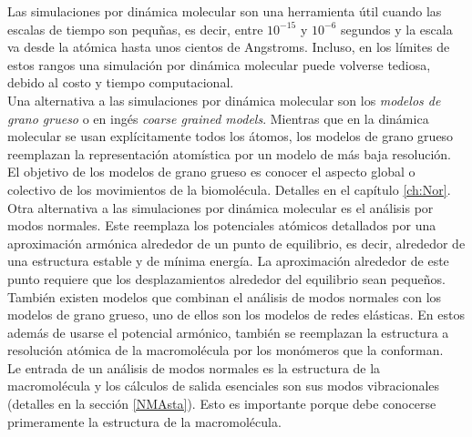 Las simulaciones por din\'{a}mica molecular son una herramienta \'{u}til cuando las escalas de tiempo son pequ\~{n}as, es decir, entre $10^{-15}$ y  $10^{-6}$ segundos y la escala va desde la at\'{o}mica hasta unos cientos de Angstroms. Incluso, en los l\'{i}mites de estos rangos una simulaci\'{o}n por din\'{a}mica molecular puede volverse tediosa, debido al costo y tiempo computacional.\\

Una alternativa a las simulaciones por din\'{a}mica molecular son los \textit{modelos de grano grueso} o en ing\'{e}s \textit{coarse grained models}.  Mientras que en la din\'{a}mica molecular se usan expl\'{i}citamente todos los \'{a}tomos, los modelos de grano grueso reemplazan la representaci\'{o}n atom\'{i}stica por un modelo de m\'{a}s baja resoluci\'{o}n. El objetivo de los modelos de grano grueso es conocer el aspecto global o colectivo de los movimientos de la biomol\'{e}cula. Detalles en el cap\'{i}tulo \ref{ch:Nor}.\\

Otra alternativa a las simulaciones por din\'{a}mica molecular es el an\'{a}lisis por modos normales. Este reemplaza los potenciales at\'{o}micos detallados por una aproximaci\'{o}n arm\'{o}nica alrededor de un punto de equilibrio, es decir, alrededor de una estructura estable y de m\'{i}nima energ\'{i}a. La aproximaci\'{o}n alrededor de este punto requiere que los desplazamientos alrededor del equilibrio sean peque\~{n}os.\\

Tambi\'{e}n existen modelos que combinan el an\'{a}lisis de modos normales con los modelos de grano grueso, uno de ellos son los modelos de redes el\'{a}sticas. En estos adem\'{a}s de usarse el potencial arm\'{o}nico, tambi\'{e}n se reemplazan la estructura a resoluci\'{o}n at\'{o}mica de la macromol\'{e}cula por los mon\'{o}meros que la conforman.\\

Le entrada de un an\'{a}lisis de modos normales es la estructura de la macromol\'{e}cula y los c\'{a}lculos de salida esenciales son sus modos vibracionales (detalles en la secci\'{o}n \ref{NMAsta}). Esto es importante porque debe conocerse primeramente la estructura de la macromol\'{e}cula.\\

